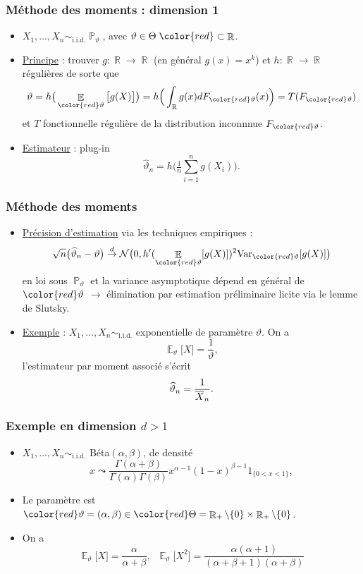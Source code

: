 ﻿\documentclass{beamer}
\DeclareMathOperator{\E}{{\mathbb E}}
\DeclareMathOperator{\R}{{\mathbb R}}
\DeclareMathOperator{\PP}{{\mathbb P}}
\DeclareMathOperator{\est}{\widehat \vartheta_{\mathnormal{n}}}
\begin{document}
\begin{frame}
\frametitle{Méthode des moments : dimension 1}
\begin{itemize}
\item $X_1,\ldots, X_n \sim_{\text{i.i.d.}} \PP_\vartheta$, avec $\vartheta \in \Theta \;{\color{red} \subset \R}$.
\item \underline{Principe} : trouver $g:\R\rightarrow \R$ (en général $g(x)=x^k$) et $h:\R\rightarrow \R$ {\color{red} régulières} de sorte que
$$\vartheta  = h\big(\E_{{\color{red}\vartheta}}\big[g(X)\big]\big) = h\Big(\int_{\R}g(x)dF_{{\color{red}\vartheta}}(x)\Big)=T(F_{{\color{red}\vartheta}})$$
et $T$ fonctionnelle régulière de la distribution inconnnue $F_{{\color{red}\vartheta}}$.
\item \underline{Estimateur} : \og plug-in \fg{}
$$\widehat \vartheta_n = h\big(\tfrac{1}{n}\sum_{i = 1}^n g(X_i)\big).$$
\end{itemize}
\end{frame}

\begin{frame}
\frametitle{Méthode des moments}
\begin{itemize}
\item \underline{Précision d'estimation} via les techniques empiriques :
$$\sqrt{n}\big(\widehat \vartheta_n - \vartheta\big) \stackrel{d}{\rightarrow} {\mathcal N}\big(0, h'(\E_{{\color{red}\vartheta}}[g(X)])^2\mathrm{Var}_{{\color{red} \vartheta}}[g(X)]\big)$$
en {\color{red} loi sous $\PP_\vartheta$} et la variance asymptotique dépend en général de ${\color{red}\vartheta}$ $\rightarrow$ élimination par estimation préliminaire licite via le lemme de Slutsky.
\item \underline{Exemple} : $X_1,\ldots, X_n\sim_{\text{i.i.d.}}$ exponentielle de paramètre $\vartheta$. On a
$$\E_\vartheta\big[X\big] = \frac{1}{\vartheta},$$
l'estimateur par moment associé s'écrit
$$\est = \frac{1}{\overline{X}_n}.$$
\end{itemize}
\end{frame}

\begin{frame}
\frametitle{Exemple en dimension $d>1$}
\begin{itemize}
\item $X_1,\ldots,X_n \sim_{\text{i.i.d.}}$ Béta$(\alpha,\beta)$, de densité
$$x \leadsto \frac{\Gamma(\alpha+\beta)}{\Gamma(\alpha)\Gamma(\beta)}x^{\alpha-1}(1-x)^{\beta-1}1_{\{0 < x < 1\}},$$
\item Le paramètre est ${\color{red}\vartheta} = (\alpha,\beta) \in {\color{red}\Theta}=\R_+\setminus\{0\} \times \R_+\setminus\{0\}$.
\item On a
$$\boxed{\E_\vartheta\big[X\big]=\frac{\alpha}{\alpha+\beta},\;\;\E_\vartheta\big[X^2\big]=\frac{\alpha(\alpha+1)}{(\alpha+\beta+1)(\alpha+\beta)}}$$
\end{itemize}
\end{frame}
\end{document}
